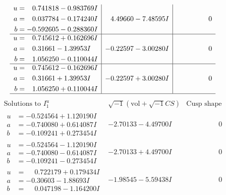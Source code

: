 \documentclass[1p]{elsarticle_modified}
\theoremstyle{definition}
\newcommand{\I}{\sqrt{-1}}
\begin{document}
$$\begin{array}{c|c|c}
\begin{aligned}
u &= \phantom{-}0.741818 - 0.983769 I \\
a &= \phantom{-}0.037784 - 0.174240 I \\
b &= -0.592605 - 0.288360 I\end{aligned}
 & \phantom{-}4.49660 - 7.48595 I & \phantom{-0.000000 } 0 \\ \hline\begin{aligned}
u &= \phantom{-}0.745612 + 0.162696 I \\
a &= \phantom{-}0.31661 - 1.39953 I \\
b &= \phantom{-}1.056250 - 0.110044 I\end{aligned}
 & -0.22597 - 3.00280 I & \phantom{-0.000000 } 0 \\ \hline\begin{aligned}
u &= \phantom{-}0.745612 - 0.162696 I \\
a &= \phantom{-}0.31661 + 1.39953 I \\
b &= \phantom{-}1.056250 + 0.110044 I\end{aligned}
 & -0.22597 + 3.00280 I & \phantom{-0.000000 } 0\\
 \hline 
 \end{array}$$\newpage$$\begin{array}{c|c|c}  
\text{Solutions to }I^u_{1}& \I (\text{vol} + \sqrt{-1}CS) & \text{Cusp shape}\\
 \hline 
\begin{aligned}
u &= -0.524564 + 1.120190 I \\
a &= -0.740080 + 0.614087 I \\
b &= -0.109241 + 0.273454 I\end{aligned}
 & -2.70133 - 4.49700 I & \phantom{-0.000000 } 0 \\ \hline\begin{aligned}
u &= -0.524564 - 1.120190 I \\
a &= -0.740080 - 0.614087 I \\
b &= -0.109241 - 0.273454 I\end{aligned}
 & -2.70133 + 4.49700 I & \phantom{-0.000000 } 0 \\ \hline\begin{aligned}
u &= \phantom{-}0.722179 + 0.179434 I \\
a &= -0.30603 - 1.88693 I \\
b &= \phantom{-}0.047198 - 1.164200 I\end{aligned}
 & -1.98545 - 5.59438 I & \phantom{-0.000000 } 0 \\ \hline\begin{aligned}

\end{aligned}
\end{array}$$
\end{document}
